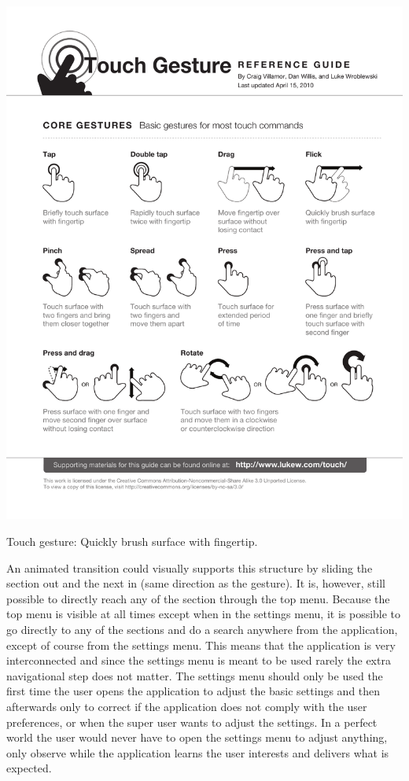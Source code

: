 \begin{sidefigure}[h!tp]
	\myfloatalign
	\includegraphics[width=\marginparwidth]{img/flick}
	\caption{Touch gesture: Quickly brush surface with fingertip.}
	\label{fig:flick}
\end{sidefigure}

An animated transition could visually supports this structure by sliding the section out and the next in (same direction as the gesture). It is, however, still possible to directly reach any of the section through the top menu. Because the top menu is visible at all times except when in the settings menu, it is possible to go directly to any of the sections and do a search anywhere from the application, except of course from the settings menu. This means that the application is very interconnected and since the settings menu is meant to be used rarely the extra navigational step does not matter. The settings menu should only be used the first time the user opens the application to adjust the basic settings and then afterwards only to correct if the application does not comply with the user preferences, or when the super user wants to adjust the settings. In a perfect world the user would never have to open the settings menu to adjust anything, only observe while the application learns the user interests and delivers what is expected.

